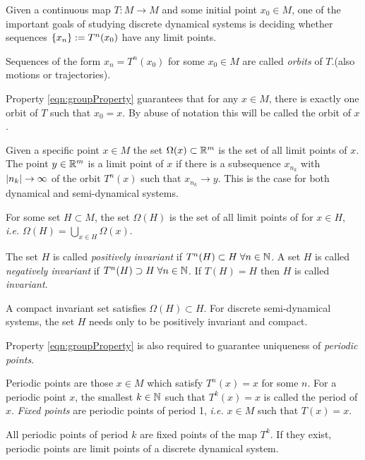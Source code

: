 Given a continuous map \( T:M\rightarrow M \) and some initial point \( x_0\in M \), one of the important goals of studying discrete dynamical systems is deciding whether sequences \( \{x_n\}\mathrel{\mathop{:}}= {T^n(x_0)} \) have any limit points.
\begin{defn}[Orbits]
	 Sequences of the form \( x_n = T^n(x_0) \) for some \( x_0 \in M \) are called \textit{orbits} of \(T\).(also motions or trajectories).%
\end{defn} 
Property \ref{eqn:groupProperty} guarantees that for any \( x\in M \), there is exactly one orbit of \(T \) such that \( x_0=x \). By abuse of notation this will be called the orbit of \( x \).

\begin{defn}\label{defn:limitpoints}
	Given a specific point \( x\in M \) the set \( \Omega(x)\subset\mathbb R^m \) is the set of all limit points of \( x \). The point \( y\in \mathbb R^m \) is a limit point of \( x \) if there is a subsequence \( x_{n_k} \)  with \( |n_k|\rightarrow\infty \) of the orbit \( T^n(x) \) such that \( x_{n_k}\rightarrow y \).  This is the case for both dynamical and semi-dynamical systems. 
\end{defn} 
For some set \( H\subset M \), the set \( \Omega(H) \) is the set of all limit points of for \( x\in H \), \textit{i.e.} \( \Omega(H)=\bigcup_{x\in H}\Omega(x) \). 
\begin{defn}
	The set \( H \) is called \textit{positively invariant} if \( T^n(H)\subset H\;\forall n\in\mathbb N \). A set \( H \) is called \textit{negatively invariant} if \( T^n(H)\supset H\;\forall n\in\mathbb N \). If \( T(H)=H \) then \( H \) is called \textit{invariant}.
\end{defn} 
A compact invariant set satisfies \( \Omega(H)\subset H \). For discrete semi-dynamical systems, the set \( H \) needs only to be positively invariant and compact.

Property \ref{eqn:groupProperty} is also required to guarantee uniqueness of \textit{periodic points}. \begin{defn}
	Periodic points are those \( x\in M \) which satisfy \( T^n(x)= x \) for some \( n \).  For a periodic point \(x\), the smallest \( k\in\mathbb N \) such that \( T^k(x)=x \) is called the period of \( x \).  \textit{Fixed points} are periodic points of period 1, \textit{i.e.} \( x\in M \) such that \( T(x) = x \).
\end{defn} 
All periodic points of period \( k \) are fixed points of the map \( T^k \). If they exist, periodic points are limit points of a discrete dynamical system.

